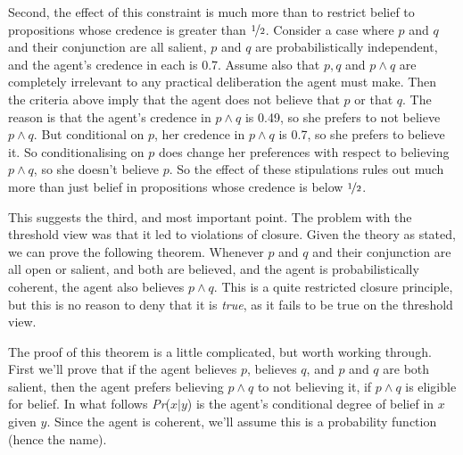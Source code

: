 Second, the effect of this constraint is much more than to restrict belief to propositions whose credence is greater than \(\nicefrac{1}{2}\). Consider a case where \(p\) and \(q\) and their conjunction are all salient, \(p\) and \(q\) are probabilistically independent, and the agent's credence in each is 0.7. Assume also that \(p, q\) and \(p \wedge q\) are completely irrelevant to any practical deliberation the agent must make. Then the criteria above imply that the agent does not believe that \(p\) or that \(q\). The reason is that the agent's credence in \(p \wedge q\) is 0.49, so she prefers to not believe \(p \wedge q\). But conditional on \(p\), her credence in \(p \wedge q\) is 0.7, so she prefers to believe it. So conditionalising on \(p\) does change her preferences with respect to believing \(p \wedge q\), so she doesn't believe \(p\). So the effect of these stipulations rules out much more than just belief in propositions whose credence is below \(\nicefrac{1}{2}\).

This suggests the third, and most important point. The problem with the threshold view was that it led to violations of closure. Given the theory as stated, we can prove the following theorem. Whenever \(p\) and \(q\) and their conjunction are all open or salient, and both are believed, and the agent is probabilistically coherent, the agent also believes \(p \wedge q\). This is a quite restricted closure principle, but this is no reason to deny that it is \textit{true}, as it fails to be true on the threshold view.

The proof of this theorem is a little complicated, but worth working through. First we'll prove that if the agent believes \(p\), believes \(q\), and \(p\) and \(q\) are both salient, then the agent prefers believing \(p \wedge q\) to not believing it, if \(p \wedge q\) is eligible for belief. In what follows \textit{Pr}(\(x | y\)) is the agent's conditional degree of belief in \(x\) given \(y\). Since the agent is coherent, we'll assume this is a probability function (hence the name).

